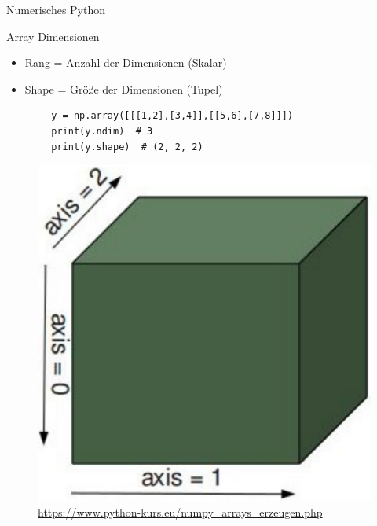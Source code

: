 \documentclass[utf8, smaller, c]{beamer}
\begin{document}
\begin{frame}{Numerisches Python}
    \begin{block}{Array Dimensionen}
        \begin{itemize}
            \item Rang = Anzahl der Dimensionen (Skalar)
            \item Shape = Größe der Dimensionen (Tupel)
        \end{itemize}
        \begin{lstlisting}
        y = np.array([[[1,2],[3,4]],[[5,6],[7,8]]])
        print(y.ndim)  # 3
        print(y.shape)  # (2, 2, 2)
        \end{lstlisting}
        \begin{figure}[hb]
            \centering
            \includegraphics[scale=0.22]{pics/array}
            {\tiny\url{https://www.python-kurs.eu/numpy_arrays_erzeugen.php}}
        \end{figure}
    \end{block}
    
    \pagebreak
    

\end{frame}
\end{document}
